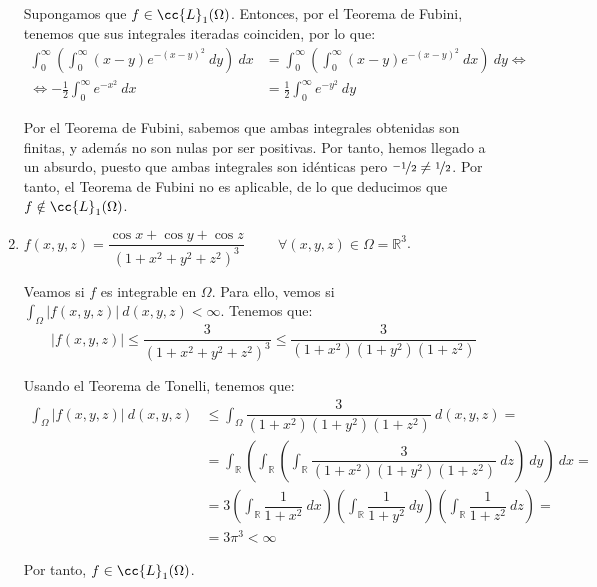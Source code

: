 \begin{ejercicio}
\begin{enumerate}
        Supongamos que $f\in \cc{L}_1(\Omega)$. Entonces,
        por el Teorema de Fubini, tenemos que sus integrales iteradas coinciden, por lo que:
        \begin{align*}
            \int_{0}^{\infty} \left( \int_{0}^{\infty} (x-y)e^{-(x-y)^2}~dy \right)~dx
            &= \int_{0}^{\infty} \left( \int_{0}^{\infty} (x-y)e^{-(x-y)^2}~dx \right)~dy
            \Longleftrightarrow\\
            \Longleftrightarrow -\frac{1}{2}\int_{0}^{\infty} e^{-x^2}~dx
            &= \frac{1}{2}\int_{0}^{\infty} e^{-y^2}~dy
        \end{align*}

       Por el Teorema de Fubini, sabemos que ambas integrales obtenidas son finitas,
       y además no son nulas por ser positivas. Por tanto, hemos llegado a un absurdo, puesto que
       ambas integrales son idénticas pero $\nicefrac{-1}{2}\neq \nicefrac{1}{2}$. Por tanto,
       el Teorema de Fubini no es aplicable, de lo que deducimos que $f\notin \cc{L}_1(\Omega)$.        


        \item $f(x, y, z) = \dfrac{\cos x + \cos y + \cos z}{(1 + x^2 + y^2 + z^2)^3} \hspace{1cm} \forall (x, y, z) \in \Omega= \mathbb{R}^3$.
        
        Veamos si $f$ es integrable en $\Omega$. Para ello, vemos si $\displaystyle \int_{\Omega} |f(x, y, z)|~d(x, y, z) < \infty$.
        Tenemos que:
        \begin{equation*}
            |f(x, y, z)| \leq \dfrac{3}{(1 + x^2 + y^2 + z^2)^3}
            \leq \dfrac{3}{(1 + x^2)(1 + y^2)(1 + z^2)}
        \end{equation*}

        Usando el Teorema de Tonelli, tenemos que:
        \begin{align*}
            \int_{\Omega} |f(x, y, z)|~d(x, y, z)
            &\leq \int_{\Omega} \dfrac{3}{(1 + x^2)(1 + y^2)(1 + z^2)}~d(x, y, z) =\\
            &= \int_{\mathbb{R}} \left( \int_{\mathbb{R}} \left( \int_{\mathbb{R}} \dfrac{3}{(1 + x^2)(1 + y^2)(1 + z^2)}~dz \right)~dy \right)~dx =\\
            &= 3\left( \int_{\mathbb{R}} \dfrac{1}{1 + x^2}~dx \right)
            \left( \int_{\mathbb{R}} \dfrac{1}{1 + y^2}~dy \right)
            \left( \int_{\mathbb{R}} \dfrac{1}{1 + z^2}~dz \right) =\\
            &= 3\pi^3 < \infty
        \end{align*}

        Por tanto, $f\in \cc{L}_1(\Omega)$.
    \end{enumerate}
    
\end{ejercicio}

